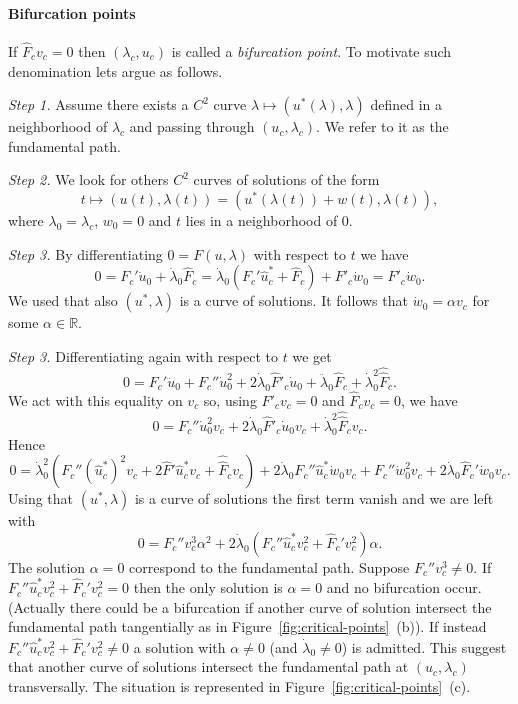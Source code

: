 \documentclass[a4paper,11pt]{article}
\theoremstyle{definition}
\begin{document}
\paragraph{Bifurcation points} If $\hat{F}_cv_c=0$ then $(\lambda_c,u_c)$ is called a \emph{bifurcation point}. To motivate such denomination lets argue as follows.

\emph{Step 1.} Assume there exists a $C^2$ curve $\lambda\mapsto(u^*(\lambda),\lambda)$ defined in a neighborhood of $\lambda_c$ and passing through $(u_c,\lambda_c)$. We refer to it as the fundamental path.

\emph{Step 2.} We look for others $C^2$ curves of solutions of the form
\[
t\mapsto(u(t),\lambda(t))=\left(u^*(\lambda(t))+w(t),\lambda(t)\right),
\]
where $\lambda_0=\lambda_c$, $w_0=0$ and $t$ lies in a neighborhood of 0.

\emph{Step 3.} By differentiating $0=F(u,\lambda)$ with respect to $t$ we have
\[
0=F_c'\dot u_0+\dot\lambda_0\hat{F}_c=\dot\lambda_0(F_c'\hat u^*_c+\hat{F}_c)+F'_c\dot w_0=F'_c\dot w_0.
\]
We used that also $(u^*,\lambda)$ is a curve of solutions. It follows that $\dot w_0=\alpha v_c$ for some $\alpha\in\mathbb{R}$.

\emph{Step 3.} Differentiating again with respect to $t$ we get
\begin{equation}
\label{eqn:second-derivative}
0=F_c'\ddot u_0+F_c''\dot u_0^2+2\dot\lambda_0\hat{F}'_c\dot u_0+\ddot\lambda_0\hat{F}_c+\dot\lambda_0^2\hat{\hat{F}}_c.
\end{equation}
We act with this equality on $v_c$ so, using $F'_cv_c=0$ and $\hat F_cv_c=0$, we have
\[
0=F_c''\dot u_0^2v_c+2\dot\lambda_0\hat{F}'_c\dot u_0v_c+\dot\lambda_0^2\hat{\hat{F}}_cv_c.
\]
Hence
\[
0=\dot\lambda_0^2(F_c''(\hat u^*_c)^2v_c+2\hat{F}'\hat u^*_cv_c+\hat{\hat{F}}_cv_c)+2\dot\lambda_0F_c''\hat u_c^*\dot{w}_0v_c+F_c''\dot w_0^2v_c+2\dot\lambda_0\hat{F}_c'\dot w_0v_c.
\]
Using that $(u^*,\lambda)$ is a curve of solutions the first term vanish and we are left with
\begin{equation}
\label{eqn:alpha-two}
0=F_c''v_c^3\alpha^2+2\dot\lambda_0(F_c''\hat u_c^*v_c^2+\hat{F}_c'v_c^2)\alpha.
\end{equation}
The solution $\alpha=0$ correspond to the fundamental path. Suppose $F_c''v_c^3\neq0$. If $F_c''\hat u_c^*v_c^2+\hat{F}_c'v_c^2=0$ then the only solution is $\alpha=0$ and no bifurcation occur. (Actually there could be a bifurcation if another curve of solution intersect the fundamental path tangentially as in Figure~\ref{fig:critical-points}~(b)). If instead $F_c''\hat u_c^*v_c^2+\hat{F}_c'v_c^2\neq0$ a solution with $\alpha\neq0$ (and $\dot\lambda_0\neq 0$) is admitted. This suggest that another curve of solutions intersect the fundamental path at $(u_c,\lambda_c)$ transversally. The situation is represented in Figure~\ref{fig:critical-points}~(c).
\end{document}
